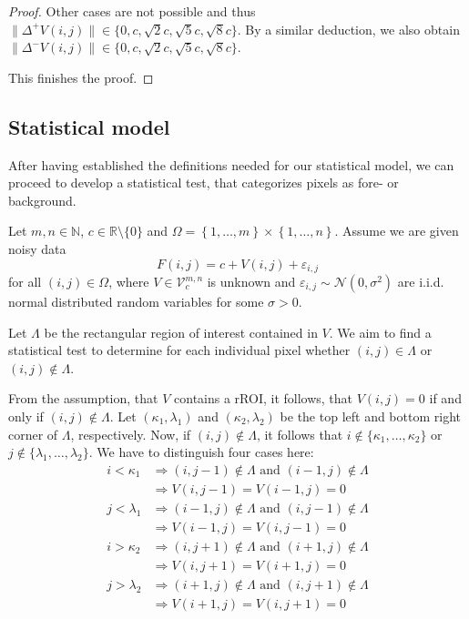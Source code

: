 \documentclass[a4paper,12pt]{article}
\newcommand{\norm}[1]{\lVert#1\rVert}
\theoremstyle{plain}
\theoremstyle{definition}
\begin{document}
\begin{proof}
	Other cases are not possible and thus $\norm{\Delta^+ V(i, j)} \in \{ 0, c, \sqrt{2} c, \sqrt{5} c, \sqrt{8} c \}$. By a similar deduction, we also obtain $\norm{\Delta^- V(i, j)} \in \{ 0, c, \sqrt{2} c, \sqrt{5} c, \sqrt{8} c \}$.
	
	This finishes the proof.
\end{proof}

\newpage

\subsection{Statistical model}\label{sectionstatisticalmodel}

After having established the definitions needed for our statistical model, we can proceed to develop a statistical test, that categorizes pixels as fore- or background.

Let $m, n \in \mathbb{N}$, $c \in \mathbb{R} \setminus \{ 0 \}$ and $\Omega = \left\{ 1, \dots, m \right\} \times \left\{ 1, \dots, n \right\}$. Assume we are given noisy data
\begin{equation}\label{image}
	F(i, j) = c + V(i, j) + \varepsilon_{i, j}
\end{equation}
for all $(i, j) \in \Omega$, where $V \in \mathcal{V}_c^{m, n}$ is unknown and $\varepsilon_{i, j} \sim \mathcal{N}(0, \sigma^2)$ are i.i.d. normal distributed random variables for some $\sigma > 0$.

Let $\varLambda$ be the rectangular region of interest contained in $V$. We aim to find a statistical test to determine for each individual pixel whether $(i, j) \in \varLambda$ or $(i, j) \notin \varLambda$.

From the assumption, that $V$ contains a rROI, it follows, that $V(i, j) = 0$ if and only if $(i, j) \notin \varLambda$. Let $(\kappa_1, \lambda_1)$ and $(\kappa_2, \lambda_2)$ be the top left and bottom right corner of $\varLambda$, respectively. Now, if $(i, j) \notin \varLambda$, it follows that $i \notin \{ \kappa_1, \dots, \kappa_2 \}$ or $j \notin \{ \lambda_1, \dots, \lambda_2 \}$. We have to distinguish four cases here:
\begin{align*}
	i < \kappa_1 &\Rightarrow (i, j - 1) \notin \varLambda \textrm{ and } (i - 1, j) \notin \varLambda \\
	&\Rightarrow V(i, j - 1) = V(i - 1, j) = 0 \\
	j < \lambda_1 &\Rightarrow (i - 1, j) \notin \varLambda \textrm{ and } (i, j - 1) \notin \varLambda \\
	&\Rightarrow V(i - 1, j) = V(i, j - 1) = 0 \\
	i > \kappa_2 &\Rightarrow (i, j + 1) \notin \varLambda \textrm{ and } (i + 1, j) \notin \varLambda \\
	&\Rightarrow V(i, j + 1) = V(i + 1, j) = 0 \\
	j > \lambda_2 &\Rightarrow (i + 1, j) \notin \varLambda \textrm{ and } (i, j + 1) \notin \varLambda \\
	&\Rightarrow V(i + 1, j) = V(i, j + 1) = 0
\end{align*}
\end{document}
